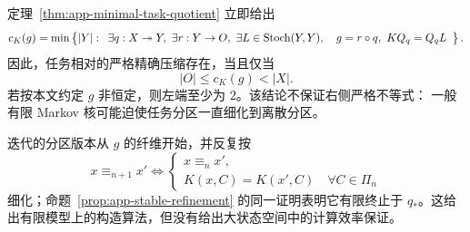 定理~\ref{thm:app-minimal-task-quotient} 立即给出
\begin{equation}
 c_K(g)=
 \min\left\{|Y|:
 \begin{array}{l}
 \exists q:X\twoheadrightarrow Y,\ \exists r:Y\to O,\
 \exists L\in\operatorname{Stoch}(Y,Y),\quad
 g=r\circ q,\ KQ_q=Q_qL
 \end{array}\right\}.
 \label{eq:app-exact-complexity-min}
\end{equation}
因此，任务相对的严格精确压缩存在，当且仅当
\begin{equation}
  |O|\le c_K(g)<|X|.
  \label{eq:app-nontrivial-exact}
\end{equation}
若按本文约定 $g$ 非恒定，则左端至少为 $2$。该结论不保证右侧严格不等式：
一般有限 Markov 核可能迫使任务分区一直细化到离散分区。

迭代的分区版本从 $g$ 的纤维开始，并反复按
\[
 x\equiv_{n+1}x'
 \Longleftrightarrow
 \left\{
 \begin{array}{l}
 x\equiv_nx',\\
 K(x,C)=K(x',C)\quad\forall C\in\Pi_n
 \end{array}\right.
\]
细化；命题~\ref{prop:app-stable-refinement} 的同一证明表明它有限终止于
$q_*$。这给出有限模型上的构造算法，但没有给出大状态空间中的计算效率保证。
